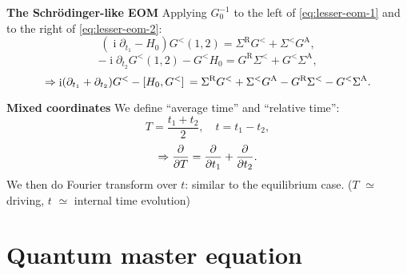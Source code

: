 \documentclass[t]{beamer}
\DeclareMathOperator{\ii}{i}
\begin{document}
\begin{frame}[allowframebreaks]
\framebreak

\textbf{The Schr\"{o}dinger-like EOM} Applying $G_0^{-1}$
to the left of \eqref{eq:lesser-eom-1} and to the right of \eqref{eq:lesser-eom-2}:
\begin{equation}
    (\ii \partial_{t_1} - H_0) G^<(1,2) = \Sigma^{\text{R}} G^< + \Sigma^< G^{\text{A}},
\end{equation}
\begin{equation}
    - \ii \partial_{t_2} G^<(1, 2) - G^< H_0 = G^{\text{R}} \Sigma^< + G^< \Sigma^{\text{A}},
\end{equation}
\begin{equation}
    \Rightarrow \ii (\partial_{t_1} + \partial_{t_2}) G^< - \comm*{H_0}{G^<} = 
    \Sigma^{\text{R}} G^< + \Sigma^< G^{\text{A}} - G^{\text{R}} \Sigma^< - G^< \Sigma^{\text{A}}.
\end{equation}

\vspace{0.25cm}

\textbf{Mixed coordinates} We define ``average time'' and ``relative time'':
\begin{equation}
    T = \frac{t_1 + t_2}{2}, \quad t = t_1 - t_2,
\end{equation}
\begin{equation}
    \Rightarrow \pdv{T} = \pdv{t_1} + \pdv{t_2}.
\end{equation}
We then do Fourier transform over $t$: 
similar to the equilibrium case. 
($T$ $\simeq$ driving, $t$ $\simeq$ internal time evolution)


\end{frame}



\section{Quantum master equation}
\end{document}
